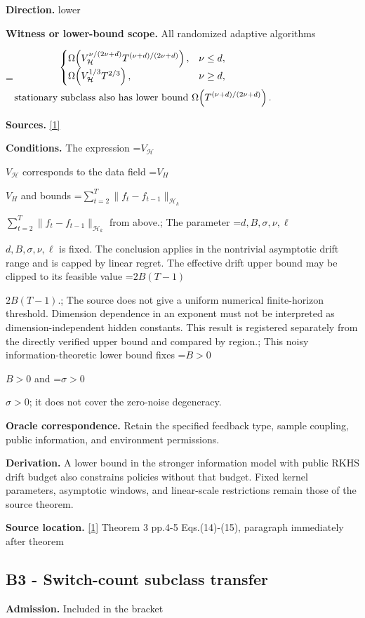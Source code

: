 \documentclass[10pt,a4paper]{article}
\newcommand{\AtlasMath}[1]{\par\begingroup\centering\setbox0=\hbox{$\displaystyle #1$}\ifdim\wd0>1.4\linewidth\typeout{ATLAS WIDE FORMULA: \the\wd0}\fi\ifdim\wd0>\linewidth\resizebox{\linewidth}{!}{\box0}\else\box0\fi\par\endgroup}
\newcommand{\AtlasInlineMath}[1]{\begingroup\setbox0=\hbox{$#1$}\ifdim\wd0>.4\linewidth\endgroup\AtlasMath{#1}\else\endgroup$#1$\fi}
\begin{document}
\textbf{Direction.} lower

\textbf{Witness or lower-bound scope.} All randomized adaptive algorithms

\AtlasMath{\begin{gathered}\begin{cases}\Omega\!\left(V_{\mathcal{H}}^{\nu/(2\nu+d)}T^{(\nu+d)/(2\nu+d)}\right),&\nu\le d,\\ \Omega\!\left(V_{\mathcal{H}}^{1/3}T^{2/3}\right),&\nu\ge d,\end{cases}\\ \text{\text{stationary subclass also has lower bound} }\Omega\!\left(T^{(\nu+d)/(2\nu+d)}\right).\end{gathered}}
\textbf{Sources.} \href{https://raw.githubusercontent.com/mlresearch/v258/main/assets/cai25a/cai25a.pdf}{[1]}

\textbf{Conditions.} The expression \AtlasInlineMath{V_{\mathcal H}} corresponds to the data field \AtlasInlineMath{V_H} and bounds \AtlasInlineMath{\sum_{t=2}^T\|f_t-f_{t-1}\|_{\mathcal H_k}} from above.; The parameter \AtlasInlineMath{d,B,\sigma,\nu,\ell} is fixed. The conclusion applies in the nontrivial asymptotic drift range and is capped by linear regret. The effective drift upper bound may be clipped to its feasible value \AtlasInlineMath{2B(T-1)}.; The source does not give a uniform numerical finite-horizon threshold. Dimension dependence in an exponent must not be interpreted as dimension-independent hidden constants. This result is registered separately from the directly verified upper bound and compared by region.; This noisy information-theoretic lower bound fixes \AtlasInlineMath{B>0} and \AtlasInlineMath{\sigma>0}; it does not cover the zero-noise degeneracy.

\textbf{Oracle correspondence.} Retain the specified feedback type, sample coupling, public information, and environment permissions.

\textbf{Derivation.} A lower bound in the stronger information model with public RKHS drift budget also constrains policies without that budget. Fixed kernel parameters, asymptotic windows, and linear-scale restrictions remain those of the source theorem.

\textbf{Source location.} \href{https://raw.githubusercontent.com/mlresearch/v258/main/assets/cai25a/cai25a.pdf}{[1]} Theorem 3 pp.4-5 Eqs.(14)-(15), paragraph immediately after theorem

\subsection{B3 - Switch-count subclass transfer}
\textbf{Admission.} Included in the bracket
\end{document}
